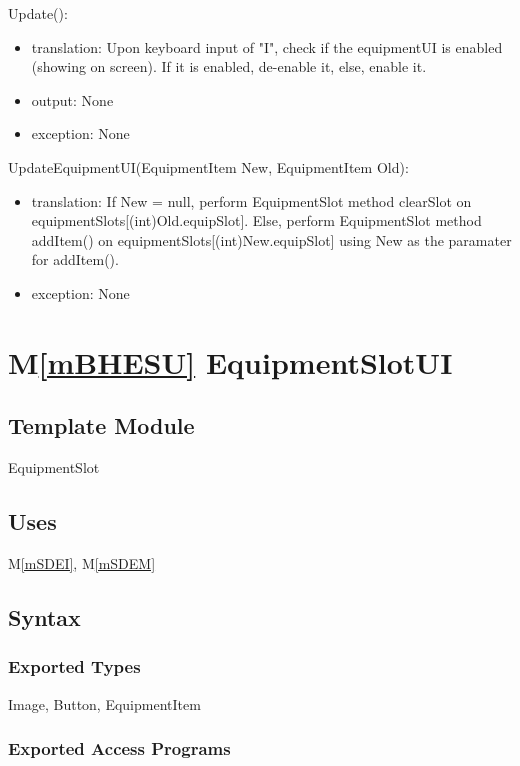\documentclass[12pt]{article}
\newcommand{\mref}[1]{M\ref{#1}}
\begin{document}
\noindent Update():
\begin{itemize}
\item translation: Upon keyboard input of "I", check if the equipmentUI is enabled (showing on screen). If it is enabled, de-enable it, else, enable it.
\item output: None
\item exception: None
\end{itemize}

\noindent UpdateEquipmentUI(EquipmentItem New, EquipmentItem Old):
\begin{itemize}
\item translation: If New = null, perform EquipmentSlot method clearSlot on equipmentSlots[(int)Old.equipSlot]. Else, perform EquipmentSlot method addItem() on equipmentSlots[(int)New.equipSlot] using New as the paramater for addItem().
\item exception: None
\end{itemize}

\newpage

\section* {\mref{mBHESU} EquipmentSlotUI}

\subsection*{Template Module}

EquipmentSlot

\subsection* {Uses}

\mref{mSDEI}, \mref{mSDEM}

\subsection* {Syntax}

\subsubsection* {Exported Types}

Image, Button, EquipmentItem

\subsubsection* {Exported Access Programs}
\end{document}
